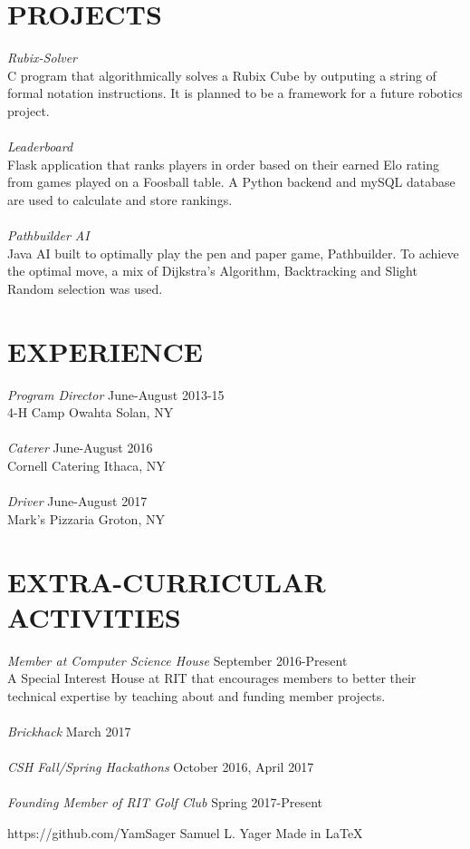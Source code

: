 \documentclass[margin]{res}
\begin{document}
\begin{resume}
\section{PROJECTS} {\sl Rubix-Solver}\\
			C program that algorithmically solves a Rubix Cube
			by outputing a string of formal notation instructions.
			It is planned to be a framework for a future robotics project.\\\\
		{\sl Leaderboard}\\
			Flask application that ranks players in order based
			on their earned Elo rating from games played on a
			Foosball table. A Python backend and mySQL database are 
			used to calculate and store rankings.\\\\ 
		{\sl Pathbuilder AI}\\
			Java AI built to optimally play the pen and paper game,
			Pathbuilder. To achieve the optimal move, a mix of 
			Dijkstra's Algorithm, Backtracking and Slight Random selection was used.

\section{EXPERIENCE} {\sl Program Director} \hfill June-August 2013-15\\
			4-H Camp Owahta Solan, NY\\\\
			{\sl Caterer} \hfill June-August 2016\\
			Cornell Catering Ithaca, NY\\\\
			{\sl Driver} \hfill June-August 2017\\
			Mark's Pizzaria Groton, NY

\section{EXTRA-CURRICULAR \\ ACTIVITIES}             
        	{\sl Member at Computer Science House} \hfill 	September 2016-Present\\
		A Special Interest House at RIT that encourages members to 
		better their technical expertise by teaching about and funding member projects.\\\\ 
		{\sl Brickhack}  \hfill 				March 2017\\\\
		{\sl CSH Fall/Spring Hackathons} \hfill 		October 2016, April 2017\\\\
		{\sl Founding Member of RIT Golf Club} \hfill 		Spring 2017-Present\\		

\end{resume}

\scriptsize{https://github.com/YamSager} \hfill 
\scriptsize{Samuel L. Yager} \hfill 
\scriptsize{Made in \LaTeX}
\end{document}
